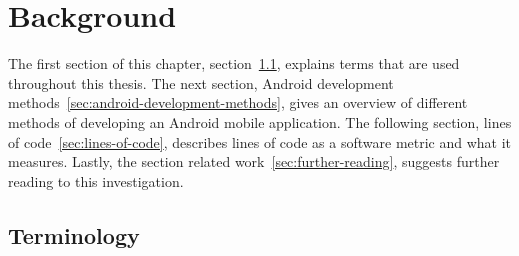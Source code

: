 \chapter{Background}\label{ch:background}
The first section of this chapter, section~\ref{sec:terminology}, explains terms that are used throughout this thesis. The next section, Android development methods~\ref{sec:android-development-methods}, gives an overview of different methods of developing an Android mobile application. The following section, lines of code~\ref{sec:lines-of-code}, describes lines of code as a software metric and what it measures. Lastly, the section related work~\ref{sec:further-reading}, suggests further reading to this investigation. 

\section{Terminology}\label{sec:terminology}
